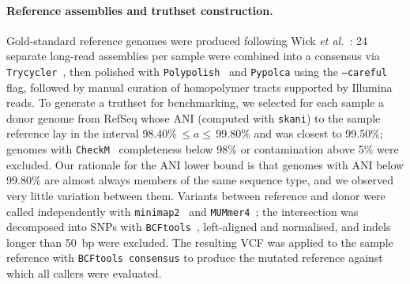 \documentclass[11pt]{article}
\begin{document}
\paragraph{Reference assemblies and truthset construction.}
Gold-standard reference genomes were produced following Wick \emph{et al.}~\citep{wick2023perfect}: 24 separate long-read assemblies per sample were combined into a consensus via \texttt{Trycycler}~\citep{wick2021trycycler}, then polished with \texttt{Polypolish}~\citep{wick2022polypolish} and \texttt{Pypolca} using the \texttt{--careful} flag, followed by manual curation of homopolymer tracts supported by Illumina reads. To generate a truthset for benchmarking, we selected for each sample a donor genome from RefSeq whose ANI (computed with \texttt{skani}) to the sample reference lay in the interval 98.40\%\,$\leq a \leq$\,99.80\% and was closest to 99.50\%; genomes with \texttt{CheckM}~\citep{parks2015checkm} completeness below 98\% or contamination above 5\% were excluded. Our rationale for the ANI lower bound is that genomes with ANI below 99.80\% are almost always members of the same sequence type, and we observed very little variation between them. Variants between reference and donor were called independently with \texttt{minimap2}~\citep{li2018minimap2} and \texttt{MUMmer4}~\citep{marcais2018mummer4}; the intersection was decomposed into SNPs with \texttt{BCFtools}~\citep{danecek2021bcftools}, left-aligned and normalised, and indels longer than 50~bp were excluded. The resulting VCF was applied to the sample reference with \texttt{BCFtools consensus} to produce the mutated reference against which all callers were evaluated.
\end{document}

